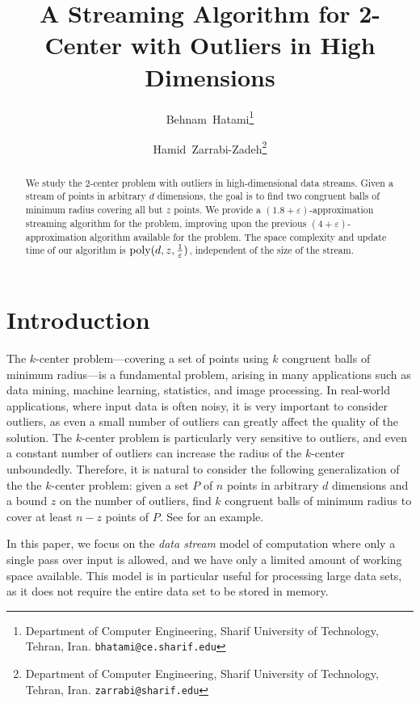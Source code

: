 \documentclass[envcountsame]{cls/cccg15}
\title{A Streaming Algorithm for 2-Center with Outliers in High Dimensions}
\author{Behnam~Hatami\thanks{Department of Computer Engineering, 
	Sharif University of Technology, Tehran, Iran.
	{\tt bhatami@ce.sharif.edu}}
	\and 
	Hamid~Zarrabi-Zadeh\thanks{Department of Computer Engineering, 
	Sharif University of Technology, Tehran, Iran.
	{\tt zarrabi@sharif.edu}}
}
\newcommand{\poly}{\mathop{\mathrm{poly}}}
\newcommand{\eps}{\varepsilon}
\begin{document}
\maketitle
\pagestyle{plain}


\begin{abstract}
We study the 2-center problem with outliers in high-dimensional data streams. 
Given a stream of points in arbitrary $d$ dimensions, the goal is to find two congruent balls 
of minimum radius covering all but $z$ points. 
We provide a $(1.8+\eps)$-approximation streaming algorithm for the problem, 
improving upon the previous $(4 + \eps)$-approximation algorithm available for the problem.
The space complexity and update time of our algorithm is $\poly(d, z, {1 \over \eps})$,
independent of the size of the stream.
\end{abstract}


\section{Introduction}
The $k$-center problem---covering a set of points 
using $k$ congruent balls of minimum radius---is a fundamental problem,
arising in many applications 
such as data mining, machine learning, statistics, and image processing.
In real-world applications, where input data is often noisy, 
it is very important to consider outliers, 
as even a small number of outliers can greatly affect the quality of the solution.
The $k$-center problem is particularly very sensitive to outliers,
and even a constant number of outliers can increase the radius of the $k$-center unboundedly.
Therefore, it is natural to consider the following generalization of
the the $k$-center problem: %
given a set $P$ of $n$ points in arbitrary $d$ dimensions
and a bound $z$ on the number of outliers,
find $k$ congruent balls of minimum radius 
to cover at least $n - z$ points of $P$.
See  for an example.

In this paper, we focus on the \emph{data stream} model of computation
where only a single pass over input is allowed,
and we have only a limited amount of working space available.
This model is in particular useful for processing large data sets,
as it does not require the entire data set to be stored in memory.
\end{document}
